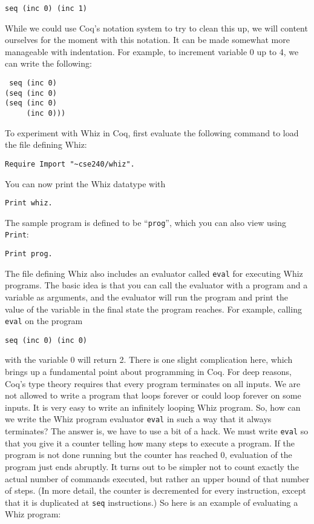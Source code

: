 \documentclass{book}[12pt]
\begin{document}
\begin{verbatim}
seq (inc 0) (inc 1)
\end{verbatim}

\noindent While we could use Coq's notation system to try to clean
this up, we will content ourselves for the moment with this notation.
It can be made somewhat more manageable with indentation.  For example,
to increment variable 0 up to 4, we can write the following:

\begin{verbatim}
 seq (inc 0)
(seq (inc 0)
(seq (inc 0)
     (inc 0)))
\end{verbatim}

\noindent To experiment with Whiz in Coq, first evaluate the following
command to load the file defining Whiz:

\begin{verbatim}
Require Import "~cse240/whiz".
\end{verbatim}

\noindent You can now print the Whiz datatype with

\begin{verbatim}
Print whiz.
\end{verbatim}

\noindent The sample program is defined to be ``\texttt{prog}'', which
you can also view using \texttt{Print}:

\begin{verbatim}
Print prog.
\end{verbatim}

\noindent The file defining Whiz also includes an evaluator called
\texttt{eval} for executing Whiz programs.  The basic idea is that
you can call the evaluator with a program and a variable as arguments,
and the evaluator will run the program and print the value of the
variable in the final state the program reaches.  For example,
calling \texttt{eval} on the program 

\begin{verbatim}
seq (inc 0) (inc 0)
\end{verbatim}

\noindent with the variable 0 will return 2.  There is one slight
complication here, which brings up a fundamental point about
programming in Coq.  For deep reasons, Coq's type theory requires that
every program terminates on all inputs.  We are not allowed to write a
program that loops forever or could loop forever on some inputs.  It
is very easy to write an infinitely looping Whiz program.  So, how can
we write the Whiz program evaluator \texttt{eval} in such a way that
it always terminates?  The answer is, we have to use a bit of a hack.
We must write \texttt{eval} so that you give it a counter telling how
many steps to execute a program.  If the program is not done running
but the counter has reached 0, evaluation of the program just ends
abruptly.  It turns out to be simpler not to count exactly the actual
number of commands executed, but rather an upper bound of that number
of steps.  (In more detail, the counter is decremented for every
instruction, except that it is duplicated at \texttt{seq}
instructions.) So here is an example of evaluating a Whiz program:
\end{document}
